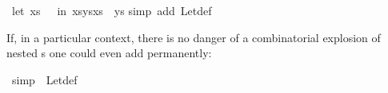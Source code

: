 %
\begin{isabellebody}%
\ {\isachardoublequote}{\isacharparenleft}let\ xs\ {\isacharequal}\ {\isacharbrackleft}{\isacharbrackright}\ in\ xs{\isacharat}ys{\isacharat}xs{\isacharparenright}\ {\isacharequal}\ ys{\isachardoublequote}\isanewline
{}simp\ add{\isacharcolon}\ Let{\isacharunderscore}def{\isacharparenright}%
\begin{isamarkuptext}%
If, in a particular context, there is no danger of a combinatorial explosion
of nested s one could even add  permanently:%
\end{isamarkuptext}%
\ {\isacharbrackleft}simp{\isacharbrackright}\ {\isacharequal}\ Let{\isacharunderscore}def\end{isabellebody}%
